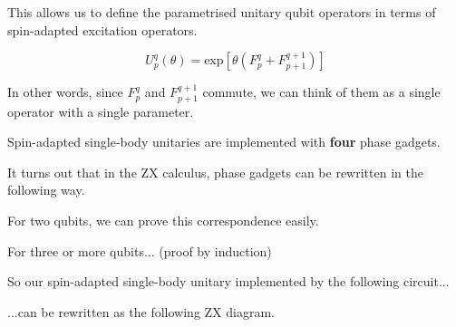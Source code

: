 This allows us to define the parametrised unitary qubit operators in terms of spin-adapted excitation operators.

\begin{equation*}
    U^q_p (\theta) = \text{exp}
    \left[ \theta \left( F_p^q + F_{p+1}^{q+1} \right) \right]
\end{equation*}

In other words, since $F_p^q$ and $F_{p+1}^{q+1}$ commute, we can think of them as a single operator with a single parameter.


Spin-adapted single-body unitaries are implemented with \textbf{four} phase gadgets. \bigskip


It turns out that in the ZX calculus, phase gadgets can be rewritten in the following way. \smallskip


For two qubits, we can prove this correspondence easily.


For three or more qubits... (proof by induction) \smallskip


So our spin-adapted single-body unitary implemented by the following circuit...


...can be rewritten as the following ZX diagram.


